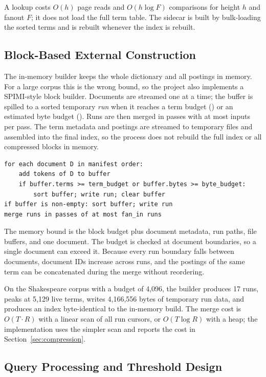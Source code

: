 A lookup costs $O(h)$ page reads and $O(h\log F)$ comparisons for height $h$
and fanout $F$; it does not load the full term table. The sidecar is built by
bulk-loading the sorted terms and is rebuilt whenever the index is rebuilt.

\subsection{Block-Based External Construction}
\label{sec:spimi}

The in-memory builder keeps the whole dictionary and all postings in memory.
For a large corpus this is the wrong bound, so the project also implements a
SPIMI-style block builder. Documents are streamed one at a time; the buffer is
spilled to a sorted temporary \emph{run} when it reaches a term budget
() or an estimated byte budget (). Runs
are then merged in passes with at most  inputs per pass.
The term metadata and postings are streamed to temporary files and assembled
into the final index, so the process does not rebuild the full index or all
compressed blocks in memory.

\begin{lstlisting}[style=cli]
for each document D in manifest order:
    add tokens of D to buffer
    if buffer.terms >= term_budget or buffer.bytes >= byte_budget:
        sort buffer; write run; clear buffer
if buffer is non-empty: sort buffer; write run
merge runs in passes of at most fan_in runs
\end{lstlisting}

The memory bound is the block budget plus document metadata, run paths, file
buffers, and one document. The budget is checked at document boundaries, so a
single document can exceed it. Because every run boundary falls between
documents, document IDs increase across runs, and the postings of the same term
can be concatenated during the merge without reordering.

On the Shakespeare corpus with a budget of 4,096, the builder produces 17 runs,
peaks at 5,129 live terms, writes 4,166,556 bytes of temporary run data, and
produces an index byte-identical to the in-memory build. The merge cost is
$O(T\cdot R)$ with a linear scan of all run cursors, or $O(T\log R)$ with a heap;
the implementation uses the simpler scan and reports the cost in
Section~\ref{sec:compression}.

\subsection{Query Processing and Threshold Design}
\label{sec:query-design}

